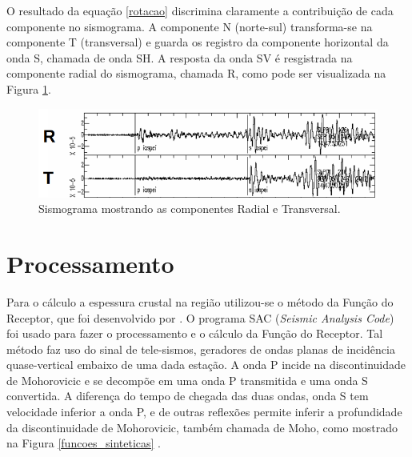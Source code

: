 O resultado da equação \ref{rotacao} discrimina claramente a contribuição de cada componente  no sismograma. A componente N (norte-sul) transforma-se na componente T (transversal) e guarda os registro da componente horizontal da onda S, chamada de onda SH. A resposta da onda SV é resgistrada na componente radial do sismograma, chamada R, como pode ser visualizada na Figura \ref{sismo_radial}.

\begin{figure}[!ht]
\centering
\includegraphics[scale=0.6]{Figs/Componente_Radial_Transversal.png}
\caption{Sismograma mostrando as componentes Radial e Transversal.}
\label{sismo_radial}
\end{figure}

\section{Processamento}

Para o cálculo a espessura crustal na região utilizou-se o método da Função do Receptor, que foi desenvolvido por \cite{Langston_1977}. O programa SAC (\textit{Seismic Analysis Code}) foi usado para fazer o processamento e o cálculo da Função do Receptor. Tal método faz uso do sinal de tele-sismos, geradores de ondas planas de incidência quase-vertical embaixo de uma dada estação. A onda P incide na discontinuidade de Mohorovicic e se decompõe em uma onda P transmitida e uma onda S convertida. A diferença do tempo de chegada das duas ondas, onda S tem velocidade inferior a onda P, e de outras reflexões permite inferir a profundidade da discontinuidade de Mohorovicic, também chamada de Moho, como mostrado na Figura \ref{funcoes_sinteticas} .

